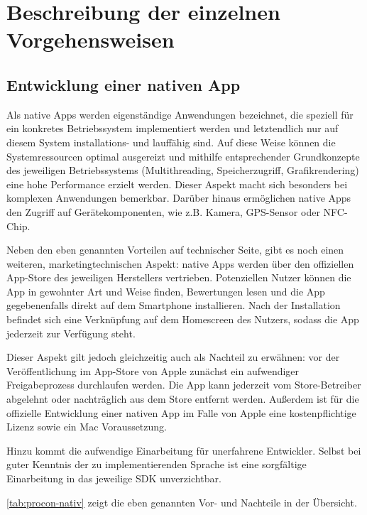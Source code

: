 \section{Beschreibung der einzelnen Vorgehensweisen}

\subsection{Entwicklung einer nativen App}
Als native Apps werden eigenständige Anwendungen bezeichnet, die speziell für ein konkretes Betriebssystem implementiert werden und letztendlich nur auf diesem System installations- und lauffähig sind. Auf diese Weise können die Systemressourcen optimal ausgereizt und mithilfe entsprechender Grundkonzepte des jeweiligen Betriebssystems (Multithreading, Speicherzugriff, Grafikrendering) eine hohe Performance erzielt werden. Dieser Aspekt macht sich besonders bei komplexen Anwendungen bemerkbar. Darüber hinaus ermöglichen native Apps den Zugriff auf Gerätekomponenten, wie z.B. Kamera, GPS-Sensor oder NFC-Chip.
 
Neben den eben genannten Vorteilen auf technischer Seite, gibt es noch einen weiteren, marketingtechnischen Aspekt: native Apps werden über den offiziellen App-Store des jeweiligen Herstellers vertrieben. Potenziellen Nutzer können die App in gewohnter Art und Weise finden, Bewertungen lesen und die App gegebenenfalls direkt auf dem Smartphone installieren. Nach der Installation befindet sich eine Verknüpfung auf dem Homescreen des Nutzers, sodass die App jederzeit zur Verfügung steht.

Dieser Aspekt gilt jedoch gleichzeitig auch als Nachteil zu erwähnen: vor der Veröffentlichung im App-Store von Apple zunächst ein aufwendiger Freigabeprozess durchlaufen werden. Die App kann jederzeit vom Store-Betreiber abgelehnt oder nachträglich aus dem Store entfernt werden. Außerdem ist für die offizielle Entwicklung einer nativen App im Falle von Apple eine kostenpflichtige Lizenz sowie ein Mac Voraussetzung.

Hinzu kommt die aufwendige Einarbeitung für unerfahrene Entwickler. Selbst bei guter Kenntnis der zu implementierenden Sprache ist eine sorgfältige Einarbeitung in das jeweilige SDK unverzichtbar. 

\vref*{tab:procon-nativ} zeigt die eben genannten Vor- und Nachteile in der Übersicht.

